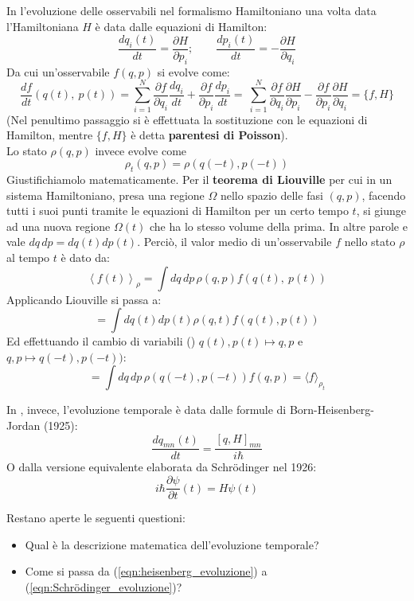 \documentclass[FisicaTeorica.tex]{subfiles}
\begin{document}
In \textbf{\MC} l'evoluzione delle osservabili nel formalismo Hamiltoniano una volta data l'Hamiltoniana $H$ è data dalle equazioni di Hamilton:
\[
\frac{dq_i\left(t\right)}{dt}=\frac{\partial H}{\partial p_i};\quad \quad \frac{dp_i\left(t\right)}{dt}=-\frac{\partial H}{\partial q_i}
\]
Da cui un'osservabile $f(q,p)$ si evolve come:
\[
\frac{df}{dt}\left(q\left(t\right),\ p\left(t\right)\right)= \sum_{i=1}^{N}{\frac{\partial f}{\partial q_i}\frac{dq_i}{dt}+\frac{\partial f}{\partial p_i}\frac{dp_i}{dt}=\ \sum_{i=1}^{N}\frac{\partial f}{\partial q_i}\frac{\partial H}{\partial p_i}-\frac{\partial f}{\partial p_i}}\frac{\partial H}{\partial q_i}=\{f,H\}
\]
(Nel penultimo passaggio si è effettuata la sostituzione con le equazioni di Hamilton, mentre $\{f,H\}$ è detta \textbf{parentesi di Poisson}).\\
Lo stato $\rho(q,p)$ invece evolve come
\begin{equation}
\rho_t\left(q,p\right)=\rho(q\left(-t\right),p\left(-t\right))
\label{eqn:evoluzione_stati_MC}
\end{equation}
Giustifichiamolo matematicamente. Per il \textbf{teorema di Liouville} per cui in un sistema Hamiltoniano, presa una regione $\Omega$ nello spazio delle fasi $(q,p)$, facendo  tutti i suoi punti tramite le equazioni di Hamilton per un certo tempo $t$, si giunge ad una nuova regione $\Omega(t)$ che ha lo stesso volume della prima. In altre parole  e vale $dq\,dp=dq\left(t\right)dp(t)$. Perciò, il valor medio di un'osservabile $f$ nello stato $\rho$ al tempo $t$ è dato da:
\[ \left\langle f\left(t\right)\right\rangle_\rho=\int dq\,dp\, \rho\left(q,p\right)f\left(q\left(t\right),\ p\left(t\right)\right) \]
Applicando Liouville si passa a:
\[
=\int dq\left(t\right) dp\left(t\right)\rho\left(q,t\right)f\left(q\left(t\right),p\left(t\right)\right)
\]
Ed effettuando il cambio di variabili () $q\left(t\right),p\left(t\right)\mapsto q,p$ e $ q,p\mapsto q\left(-t\right),p(-t))$:
\[
= \int dq\, dp\, \rho(q(-t), p(-t))f(q,p) = \langle f\rangle_{\rho_t}
\]

In \textbf{\MQ}, invece, l'evoluzione temporale è data dalle formule di Born-Heisenberg-Jordan (1925):
\begin{equation}
    \frac{dq_{mn}\left(t\right)}{dt}=\frac{\left[q,H\right]_{mn}}{i\hbar}
    \label{eqn:heisenberg_evoluzione}
\end{equation}
O dalla versione equivalente elaborata da Schrödinger nel 1926:
\begin{equation}
i\hbar \frac{\partial \psi}{\partial t}(t) = H\psi(t)
    \label{eqn:Schrödinger_evoluzione}
\end{equation}

Restano aperte le seguenti questioni:
\begin{itemize}
    \item Qual è la descrizione matematica dell'evoluzione temporale?
    \item Come si passa da (\ref{eqn:heisenberg_evoluzione}) a (\ref{eqn:Schrödinger_evoluzione})?
\end{itemize}
\end{document}
